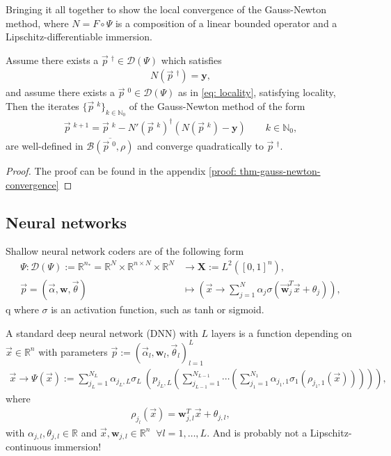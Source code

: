 Bringing it all together to show the local convergence of the Gauss-Newton
method, where $N = F\circ \Psi$ is a composition of a linear bounded operator
and a Lipschitz-differentiable immersion.
\begin{theorem}
    \label{thm: gauss-newton-convergence}
    Assume there exists a $\vec{p}\;^{\dagger} \in \mathcal{D}(\Psi)$ which
    satisfies
    \begin{align}
        N(\vec{p}\;^{\dagger}) = \mathbf{y},
    \end{align}
    and assume there exists a $\vec{p}\;^{0} \in \mathcal{D}(\Psi)$ as in
    \ref{eq: locality}, satisfying locality, Then the iterates
    $\{\vec{p}\;^{k}\}_{k\in \mathbb{N}_0}$  of the Gauss-Newton method of
    the form
     \begin{align}
         \vec{p}\;^{k+1} = \vec{p}\;^{k} - N'(\vec{p}\;^{k})^{\dagger}\left(
         N\left(\vec{p}\;^{k}  \right) - \mathbf{y} \right)  \qquad k \in
         \mathbb{N}_0, \label{eq: gauss-newton-iteration}
     \end{align}
     are well-defined in $\overline{\mathcal{B}\left(\vec{p}\;^{0}, \rho
     \right) }$ and converge quadratically to $\vec{p}\;^{\dagger}$.
\end{theorem}
\begin{proof}
    The proof can be found in the appendix \ref{proof: thm-gauss-newton-convergence}
\end{proof}


\subsection{Neural networks}
Shallow neural network coders are of the following form
\begin{align}
    \label{eq: shallow-nn}
    \Psi:
    \mathcal{D}(\Psi) := \mathbb{R}^{n_*} =
    \mathbb{R}^{N}\times \mathbb{R}^{n \times N}
    \times \mathbb{R}^{N}
    &\to \mathbf{X} :=
    L^{2}\left([0, 1]^{n}\right),\\
    \vec{p} = (\vec{\alpha}, \mathbf{w}, \vec{\theta}) &\mapsto
    \left(\vec{x} \to \sum_{j=1}^{N} \alpha_j\sigma\left(
    \vec{\mathbf{w}}_j^{T}\vec{x} + \theta_j \right)  \right),
\end{align}q
where $\sigma$ is an activation function, such as tanh or sigmoid.

A standard deep neural network (DNN) with $L$ layers is a function depending on $\vec{x} \in
\mathbb{R}^{n}$ with parameters $\vec{p}:=\left( \vec{\alpha}_l,
\mathbf{w}_l, \vec{\theta}_l  \right)_{l=1}^{L}$
\begin{align}
    \vec{x}\to\Psi(\vec{x}) := \sum_{j_L=1}^{N_L} \alpha_{j_L,L}\sigma_L\
    \left( p_{j_L, L} \left( \sum_{j_{L-1}=1}^{N_{L-1}}\cdots
    \left( \sum_{j_1=1}^{N_1}\alpha_{j_1,1}\sigma_1\left(\rho_{j_1,1}(\vec{x})
    \right)  \right)  \right)  \right),
\end{align}
where
\begin{align}
    \rho_{j_l}(\vec{x}) = \mathbf{w}_{j, l}^{T}\vec{x} + \theta_{j,l},
\end{align}
with $\alpha_{j,l}, \theta_{j,l} \in \mathbb{R}$ and $\vec{x},
\mathbf{w}_{j,l} \in \mathbb{R}^{n} \;\; \forall l=1,\ldots,L$. And is
probably not a Lipschitz-continuous immersion!

